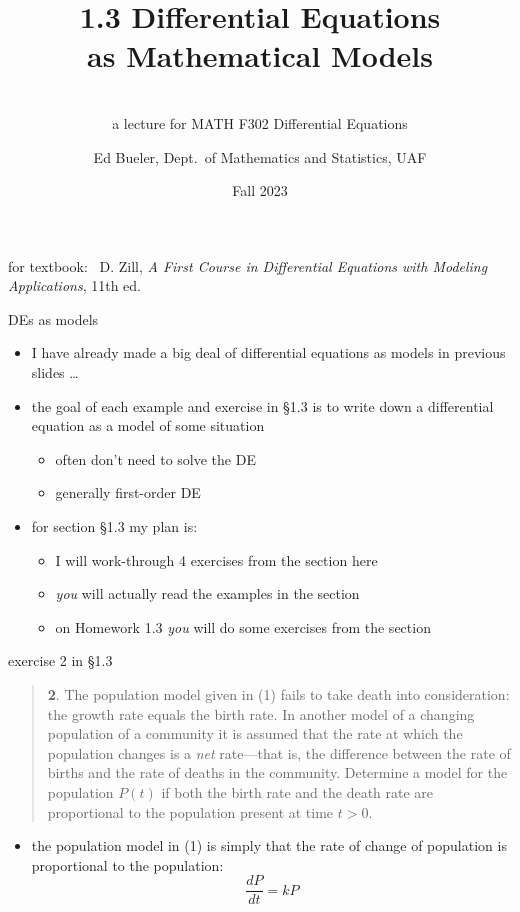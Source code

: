 \documentclass{beamer}
\title{1.3 Differential Equations \\ as Mathematical Models}
\subtitle{\phantom{foo} \\ a lecture for MATH F302 Differential Equations}
\author{Ed Bueler, Dept.~of Mathematics and Statistics, UAF}
\date{Fall 2023}
\begin{document}


\begin{frame}
\titlepage

\centerline{\tiny for textbook: \, D. Zill, \emph{A First Course in Differential Equations with Modeling Applications}, 11th ed.}
\end{frame}


\begin{frame}{DEs as models}

\begin{itemize}
\item I have already made a big deal of differential equations as models in previous slides \dots
\item the goal of each example and exercise in \S 1.3 is to \alert{write down a differential equation} as a model of some situation
    \begin{itemize}
    \item often don't need to solve the DE
    \item generally first-order DE
    \end{itemize}
\item for section \S 1.3 my plan is:
    \begin{itemize}
    \item I will work-through \alert{4 exercises from the section} here
    \item \emph{you} will actually read the examples in the section
    \item on Homework 1.3 \emph{you} will do some exercises from the section
    \end{itemize}
\end{itemize}
\end{frame}


\begin{frame}{exercise 2 in \S 1.3}

\scriptsize
\begin{quotation}
\noindent \textbf{2}.  The population model given in (1) fails to take death into consideration: the growth rate equals the birth rate.  In another model of a changing population of a community it is assumed that the rate at which the population changes is a \emph{net} rate---that is, the difference between the rate of births and the rate of deaths in the community.  Determine a model for the population $P(t)$ if both the birth rate and the death rate are proportional to the population present at time $t>0$.
\end{quotation}

\normalsize
\bigskip

\begin{itemize}
\item the population model in (1) is simply that the rate of change of population is proportional to the population:
    $$\frac{dP}{dt} = k P$$
\end{itemize}
\end{frame}
\end{document}
